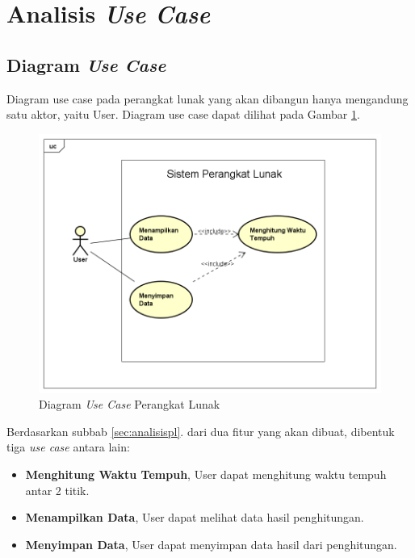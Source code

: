 \section{Analisis \textit{Use Case}}
\label{sec:analisisusecase}

\subsection{Diagram \textit{Use Case}}
\label{subsec:diagramusecase}

Diagram use case pada perangkat lunak yang akan dibangun hanya mengandung satu aktor, yaitu User. Diagram use case dapat dilihat pada Gambar \ref{fig:diagramusecase}.

\begin{figure}[H]
				\centering		
				\includegraphics[scale=0.6]{Gambar/UseCaseDiagram.png}
				\caption[Diagram \textit{Use Case} Perangkat Lunak]{Diagram \textit{Use Case} Perangkat Lunak}
				\label{fig:diagramusecase}	
			\end{figure}
			
Berdasarkan subbab \ref{sec:analisispl}. dari dua fitur yang akan dibuat, dibentuk tiga \textit{use case} antara lain:
\begin{itemize}
\item \textbf{Menghitung Waktu Tempuh}, User dapat menghitung waktu tempuh antar 2 titik.
\item \textbf{Menampilkan Data}, User dapat melihat data hasil penghitungan.
\item \textbf{Menyimpan Data}, User dapat menyimpan data hasil dari penghitungan.
\end{itemize}

